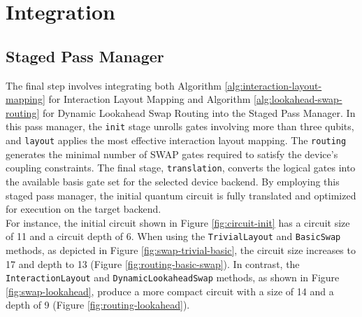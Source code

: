 \section{Integration}
\subsection{Staged Pass Manager} %
The final step involves integrating both Algorithm \ref{alg:interaction-layout-mapping} for Interaction Layout Mapping and Algorithm \ref{alg:lookahead-swap-routing} for Dynamic Lookahead Swap Routing into the Staged Pass Manager. In this pass manager, the \lstinline{init} stage unrolls gates involving more than three qubits, and \lstinline{layout} applies the most effective interaction layout mapping. The \lstinline{routing} generates the minimal number of SWAP gates required to satisfy the device's coupling constraints. The final stage, \lstinline{translation}, converts the logical gates into the available basis gate set for the selected device backend. By employing this staged pass manager, the initial quantum circuit is fully translated and optimized for execution on the target backend. \\
For instance, the initial circuit shown in Figure \ref{fig:circuit-init} has a circuit size of 11 and a circuit depth of 6. When using the \lstinline{TrivialLayout} and \lstinline{BasicSwap} methods, as depicted in Figure \ref{fig:swap-trivial-basic}, the circuit size increases to 17 and depth to 13 (Figure \ref{fig:routing-basic-swap}). In contrast, the \lstinline{InteractionLayout} and \lstinline{DynamicLookaheadSwap} methods, as shown in Figure \ref{fig:swap-lookahead}, produce a more compact circuit with a size of 14 and a depth of 9 (Figure \ref{fig:routing-lookahead}).

